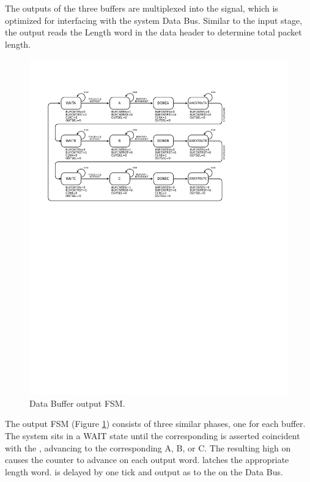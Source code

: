 The outputs of the three buffers are multiplexed into the
 signal, which is optimized for interfacing with
the system Data Bus. Similar to the input stage, the output reads the
Length word in the data header to determine total packet length.

\begin{figure}[h!]
  \includegraphics[scale=0.8]{output.FSM.svg}
  \caption{Data Buffer output FSM.}
  \label{OutputFSM}
\end{figure}
The output FSM  (Figure \ref{OutputFSM}) consists of
three similar phases, one for each buffer. The system sits in a WAIT
state until the corresponding  is asserted
coincident with the , advancing to the corresponding
A, B, or C. The resulting high on  causes the
 counter to advance on each output word.
 latches the appropriate length word.
 is delayed by one tick and output as
 to the  on the Data Bus.

